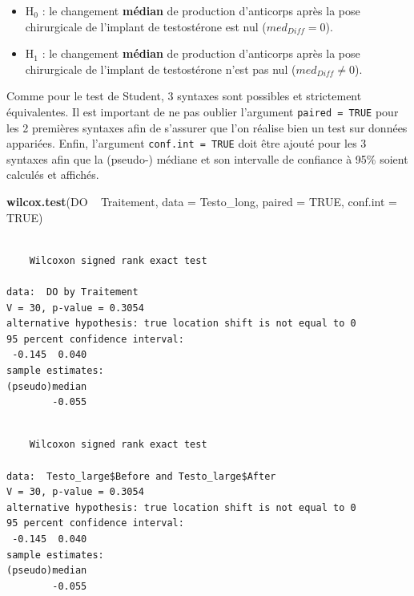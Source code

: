 \documentclass[
  a4paper,
]{article}
\newenvironment{Shaded}{\begin{snugshade}}{\end{snugshade}}
\newcommand{\DataTypeTok}[1]{\textcolor[rgb]{0.00,0.34,0.68}{#1}}
\newcommand{\KeywordTok}[1]{\textcolor[rgb]{0.12,0.11,0.11}{\textbf{#1}}}
\newcommand{\NormalTok}[1]{\textcolor[rgb]{0.12,0.11,0.11}{#1}}
\newcommand{\OperatorTok}[1]{\textcolor[rgb]{0.12,0.11,0.11}{#1}}
\newcommand{\OtherTok}[1]{\textcolor[rgb]{0.00,0.43,0.16}{#1}}
\newcommand{\StringTok}[1]{\textcolor[rgb]{0.75,0.01,0.01}{#1}}
\providecommand{\tightlist}{%
  \setlength{\itemsep}{0pt}\setlength{\parskip}{0pt}}
\begin{document}
\begin{itemize}
\tightlist
\item
  H\(_0\) : le changement \textbf{médian} de production d'anticorps après la pose chirurgicale de l'implant de testostérone est nul (\(med_{Diff} = 0\)).
\item
  H\(_1\) : le changement \textbf{médian} de production d'anticorps après la pose chirurgicale de l'implant de testostérone n'est pas nul (\(med_{Diff} \neq 0\)).
\end{itemize}

Comme pour le test de Student, 3 syntaxes sont possibles et strictement équivalentes. Il est important de ne pas oublier l'argument \texttt{paired\ =\ TRUE} pour les 2 premières syntaxes afin de s'assurer que l'on réalise bien un test sur données appariées. Enfin, l'argument \texttt{conf.int\ =\ TRUE} doit être ajouté pour les 3 syntaxes afin que la (pseudo-) médiane et son intervalle de confiance à 95\% soient calculés et affichés.

\begin{Shaded}
\begin{Highlighting}[]
\KeywordTok{wilcox.test}\NormalTok{(DO }\OperatorTok{~}\StringTok{ }\NormalTok{Traitement, }\DataTypeTok{data =}\NormalTok{ Testo_long, }\DataTypeTok{paired =} \OtherTok{TRUE}\NormalTok{, }\DataTypeTok{conf.int =} \OtherTok{TRUE}\NormalTok{)}
\end{Highlighting}
\end{Shaded}

\begin{verbatim}

    Wilcoxon signed rank exact test

data:  DO by Traitement
V = 30, p-value = 0.3054
alternative hypothesis: true location shift is not equal to 0
95 percent confidence interval:
 -0.145  0.040
sample estimates:
(pseudo)median 
        -0.055 
\end{verbatim}

\begin{Shaded}
\end{Shaded}

\begin{verbatim}

    Wilcoxon signed rank exact test

data:  Testo_large$Before and Testo_large$After
V = 30, p-value = 0.3054
alternative hypothesis: true location shift is not equal to 0
95 percent confidence interval:
 -0.145  0.040
sample estimates:
(pseudo)median 
        -0.055 
\end{verbatim}
\end{document}
